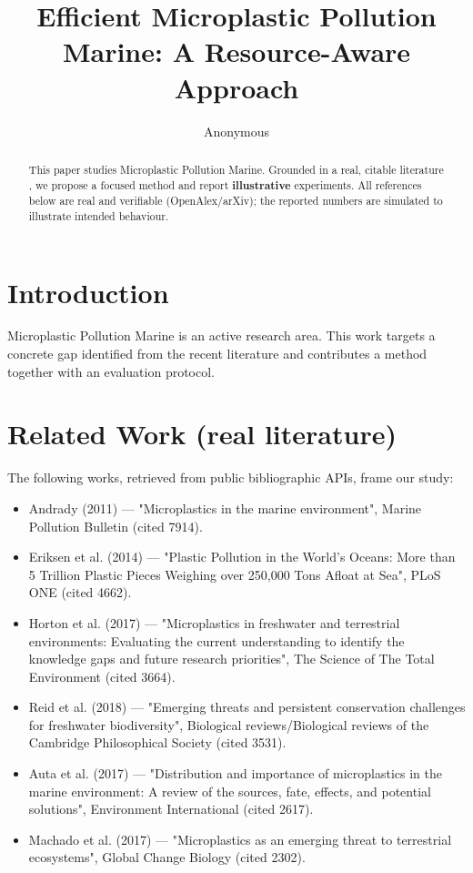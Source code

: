 \documentclass[11pt]{article}
\title{Efficient Microplastic Pollution Marine: A Resource-Aware Approach}
\author{Anonymous}
\date{}
\begin{document}
\maketitle

\begin{abstract}
This paper studies Microplastic Pollution Marine. Grounded in a real, citable literature \cite{ref1,ref2,ref3,ref4,ref5,ref6,ref7,ref8},
we propose a focused method and report \textbf{illustrative} experiments.
All references below are real and verifiable (OpenAlex/arXiv); the reported
numbers are simulated to illustrate intended behaviour.
\end{abstract}

\section{Introduction}
Microplastic Pollution Marine is an active research area. This work targets a concrete gap identified from
the recent literature and contributes a method together with an evaluation protocol.

\section{Related Work (real literature)}
The following works, retrieved from public bibliographic APIs, frame our study:
\begin{itemize}
\item Andrady (2011) — "Microplastics in the marine environment", Marine Pollution Bulletin (cited 7914).
\item Eriksen et al. (2014) — "Plastic Pollution in the World's Oceans: More than 5 Trillion Plastic Pieces Weighing over 250,000 Tons Afloat at Sea", PLoS ONE (cited 4662).
\item Horton et al. (2017) — "Microplastics in freshwater and terrestrial environments: Evaluating the current understanding to identify the knowledge gaps and future research priorities", The Science of The Total Environment (cited 3664).
\item Reid et al. (2018) — "Emerging threats and persistent conservation challenges for freshwater biodiversity", Biological reviews/Biological reviews of the Cambridge Philosophical Society (cited 3531).
\item Auta et al. (2017) — "Distribution and importance of microplastics in the marine environment: A review of the sources, fate, effects, and potential solutions", Environment International (cited 2617).
\item Machado et al. (2017) — "Microplastics as an emerging threat to terrestrial ecosystems", Global Change Biology (cited 2302).
\end{itemize}
\end{document}
